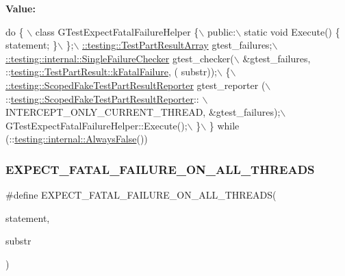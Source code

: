 {\bfseries Value\+:}
\begin{DoxyCode}
\textcolor{keywordflow}{do} \{ \(\backslash\)
    class GTestExpectFatalFailureHelper \{\(\backslash\)
     public:\(\backslash\)
      static \textcolor{keywordtype}{void} Execute() \{ statement; \}\(\backslash\)
    \};\(\backslash\)
    \hyperlink{classtesting_1_1_test_part_result_array}{::testing::TestPartResultArray} gtest\_failures;\(\backslash\)
    \hyperlink{classtesting_1_1internal_1_1_single_failure_checker}{::testing::internal::SingleFailureChecker} gtest\_checker(\(\backslash\)
        &gtest\_failures, ::\hyperlink{classtesting_1_1_test_part_result_a65ae656b33fdfdfffaf34858778a52d5ae1bf0b610b697a43fee97628cdab4ea1}{testing::TestPartResult::kFatalFailure}, (
      substr));\(\backslash\)
    \{\(\backslash\)
      \hyperlink{classtesting_1_1_scoped_fake_test_part_result_reporter}{::testing::ScopedFakeTestPartResultReporter} gtest\_reporter
      (\(\backslash\)
          ::\hyperlink{classtesting_1_1_scoped_fake_test_part_result_reporter}{testing::ScopedFakeTestPartResultReporter}:: \(\backslash\)
          INTERCEPT\_ONLY\_CURRENT\_THREAD, &gtest\_failures);\(\backslash\)
      GTestExpectFatalFailureHelper::Execute();\(\backslash\)
    \}\(\backslash\)
  \} \textcolor{keywordflow}{while} (::\hyperlink{namespacetesting_1_1internal_a4b24c851ab13569b1b15b3d259b60d2e}{testing::internal::AlwaysFalse}())
\end{DoxyCode}
\mbox{\label{gtest-spi_8h_ad8aac5bc859b2ddc07583636ae4f45cf}} 
\subsubsection{\texorpdfstring{E\+X\+P\+E\+C\+T\+\_\+\+F\+A\+T\+A\+L\+\_\+\+F\+A\+I\+L\+U\+R\+E\+\_\+\+O\+N\+\_\+\+A\+L\+L\+\_\+\+T\+H\+R\+E\+A\+DS}{EXPECT\_FATAL\_FAILURE\_ON\_ALL\_THREADS}}
{\footnotesize\ttfamily \#define E\+X\+P\+E\+C\+T\+\_\+\+F\+A\+T\+A\+L\+\_\+\+F\+A\+I\+L\+U\+R\+E\+\_\+\+O\+N\+\_\+\+A\+L\+L\+\_\+\+T\+H\+R\+E\+A\+DS(\begin{DoxyParamCaption}\item[{}]{statement,  }\item[{}]{substr }\end{DoxyParamCaption})}

